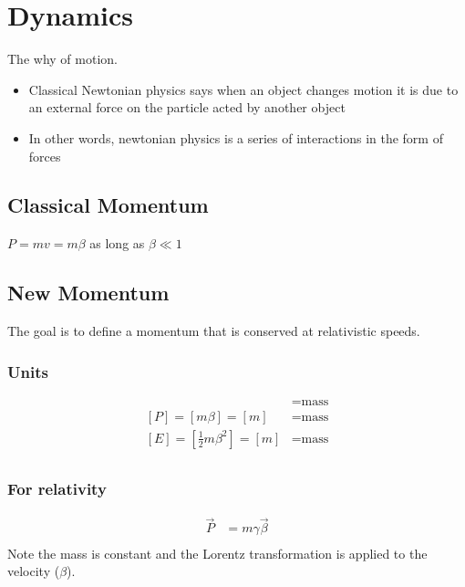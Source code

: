 \documentclass[12pt,letterpaper, twocolumn]{article}
\begin{document}
\section{Dynamics}
The why of motion. 

\begin{itemize}
    \item Classical Newtonian physics says when an object changes motion it is due to an external force on the particle acted by another object
    \item In other words, newtonian physics is a series of interactions in the form of forces
\end{itemize}

\subsection*{Classical Momentum}
$P=mv=m\beta$ as long as $\beta \ll 1$
\subsection*{New Momentum}
The goal is to define a momentum that is conserved at relativistic speeds. 
\subsubsection*{Units}
\begin{align*}
    [m]&=\text{mass}\\
    [P]=[m\beta]=[m]&=\text{mass}\\
    [E]=[\frac{1}{2}m\beta^2]=[m]&=\text{mass}\\
\end{align*}
\subsubsection*{For relativity}
\begin{align*}
    \vec{P} &= m\gamma\vec{\beta}\\
\end{align*}
Note the mass is constant and the Lorentz transformation is applied to the velocity ($\beta$).
\end{document}
